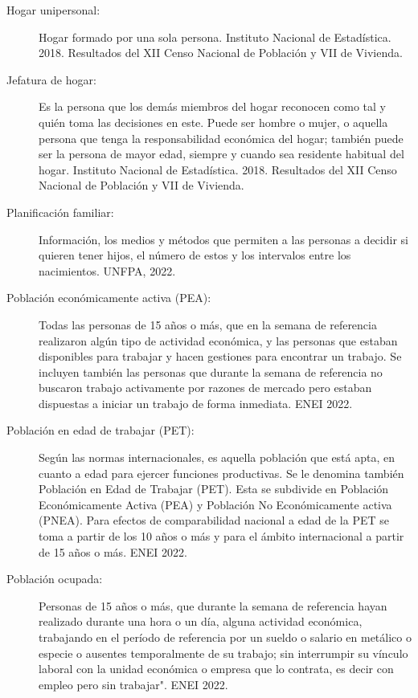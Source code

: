 \begin{description}
	\item[Hogar unipersonal:] Hogar formado por una sola persona. Instituto Nacional de Estadística. 2018. Resultados del XII Censo Nacional de Población y VII de Vivienda. 
	\item[Jefatura de hogar:] Es la persona que los demás miembros del hogar reconocen como tal y quién toma las decisiones en este. Puede ser hombre o mujer, o aquella persona que tenga la responsabilidad económica del hogar; también puede ser la persona de mayor edad, siempre y cuando sea residente habitual del hogar. Instituto Nacional de Estadística. 2018. Resultados del XII Censo Nacional de Población y VII de Vivienda.
	\item[Planificación familiar:] Información, los medios y métodos que permiten a las personas a decidir si quieren tener hijos, el número de estos y los intervalos entre los nacimientos. UNFPA, 2022. 
	\item[Población económicamente activa (PEA):] Todas las personas de 15 años o más, que en la semana de referencia realizaron algún tipo de actividad económica, y las personas que estaban disponibles para trabajar y hacen gestiones para encontrar un trabajo. Se incluyen también las personas que durante la semana de referencia no buscaron trabajo activamente por razones de mercado pero estaban dispuestas a iniciar un trabajo de forma inmediata. ENEI 2022.
	\item[Población en edad de trabajar (PET):] Según las normas internacionales, es aquella población que está apta, en cuanto a edad para ejercer funciones productivas. Se le denomina también Población en Edad de Trabajar (PET). Esta se subdivide en Población Económicamente Activa (PEA) y Población No Económicamente activa (PNEA). Para efectos de comparabilidad nacional a edad de la PET se toma a partir de los 10 años o más y para el ámbito internacional a partir de 15 años o más. ENEI 2022.
	\item[Población ocupada:] Personas de 15 años o más, que durante la semana de referencia hayan realizado durante una hora o un día, alguna actividad económica, trabajando en el período de referencia por un sueldo o salario en metálico o especie o ausentes temporalmente de su trabajo; sin interrumpir su vínculo laboral con la unidad económica o empresa que lo contrata, es decir con empleo pero sin trabajar". ENEI 2022.

\end{description}
